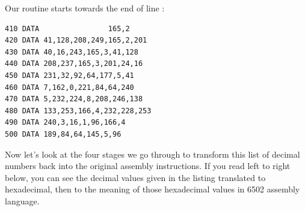 Our  routine starts towards the end of line :
\begin{lstlisting}[escapechar=\%]
410 DATA                165,2
420 DATA 41,128,208,249,165,2,201
430 DATA 40,16,243,165,3,41,128
440 DATA 208,237,165,3,201,24,16
450 DATA 231,32,92,64,177,5,41
460 DATA 7,162,0,221,84,64,240
470 DATA 5,232,224,8,208,246,138
480 DATA 133,253,166,4,232,228,253
490 DATA 240,3,16,1,96,166,4
500 DATA 189,84,64,145,5,96   
\end{lstlisting}

Now let's look at the four stages we go through to transform this list of decimal numbers back into the original
assembly instructions. If you read left to right below, you can see the decimal values given in the listing translated to
hexadecimal, then to the meaning of those hexadecimal values in 6502 assembly language.

